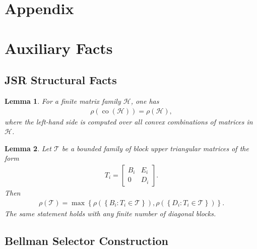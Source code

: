 \documentclass[letterpaper]{article}
\numberwithin{equation}{section}
\newtheorem{lemma}{Lemma}[section]
\newcommand{\co}{\operatorname{co}}
\begin{document}
\clearpage
\onecolumn
\appendix
\section*{\LARGE Appendix}
\section{Auxiliary Facts}
\label{app:auxiliary-facts}

\subsection{JSR Structural Facts}
\label{app:jsr-structural-facts}

\begin{lemma}
\label{lem:convex-hull-jsr}
For a finite matrix family $\mathcal H$, one has
\begin{align*}
  \rho(\co(\mathcal H))=\rho(\mathcal H),
\end{align*}
where the left-hand side is computed over all convex combinations of matrices in
$\mathcal H$.
\end{lemma}

\begin{lemma}
\label{lem:block-triangular-jsr}
Let $\mathcal T$ be a bounded family of block upper triangular matrices of the
form
\begin{align*}
  T_i=\begin{bmatrix}B_i&E_i\\0&D_i\end{bmatrix}.
\end{align*}
Then
\begin{align*}
  \rho(\mathcal T)
  =\max\left\{
    \rho\left(\left\{B_i:T_i\in\mathcal T\right\}\right),
    \rho\left(\left\{D_i:T_i\in\mathcal T\right\}\right)
  \right\}.
\end{align*}
The same statement holds with any finite number of diagonal blocks.
\end{lemma}

\subsection{Bellman Selector Construction}
\label{app:bellman-selector-construction}
\end{document}
